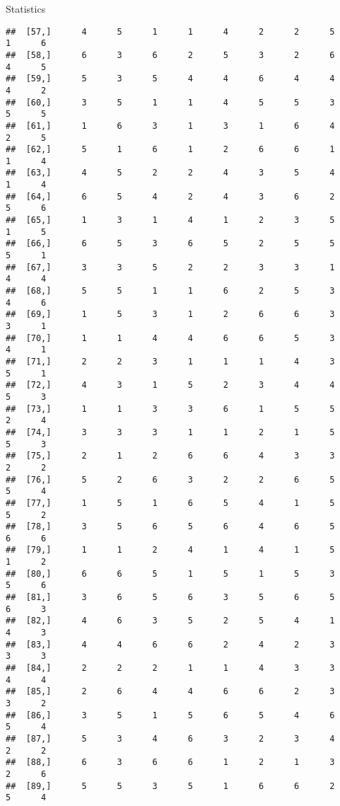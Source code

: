 \documentclass[
  ignorenonframetext,
]{beamer}
\begin{document}
\begin{frame}[fragile]{Statistics}
\begin{verbatim}
##  [57,]      4      5      1      1      4      2      2      5      1      6
##  [58,]      6      3      6      2      5      3      2      6      4      5
##  [59,]      5      3      5      4      4      6      4      4      4      2
##  [60,]      3      5      1      1      4      5      5      3      5      5
##  [61,]      1      6      3      1      3      1      6      4      2      5
##  [62,]      5      1      6      1      2      6      6      1      1      4
##  [63,]      4      5      2      2      4      3      5      4      1      4
##  [64,]      6      5      4      2      4      3      6      2      5      6
##  [65,]      1      3      1      4      1      2      3      5      1      5
##  [66,]      6      5      3      6      5      2      5      5      5      1
##  [67,]      3      3      5      2      2      3      3      1      4      4
##  [68,]      5      5      1      1      6      2      5      3      4      6
##  [69,]      1      5      3      1      2      6      6      3      3      1
##  [70,]      1      1      4      4      6      6      5      3      4      1
##  [71,]      2      2      3      1      1      1      4      3      5      1
##  [72,]      4      3      1      5      2      3      4      4      5      3
##  [73,]      1      1      3      3      6      1      5      5      2      4
##  [74,]      3      3      3      1      1      2      1      5      5      3
##  [75,]      2      1      2      6      6      4      3      3      2      2
##  [76,]      5      2      6      3      2      2      6      5      5      4
##  [77,]      1      5      1      6      5      4      1      5      5      2
##  [78,]      3      5      6      5      6      4      6      5      6      6
##  [79,]      1      1      2      4      1      4      1      5      1      2
##  [80,]      6      6      5      1      5      1      5      3      5      6
##  [81,]      3      6      5      6      3      5      6      5      6      3
##  [82,]      4      6      3      5      2      5      4      1      4      3
##  [83,]      4      4      6      6      2      4      2      3      3      3
##  [84,]      2      2      2      1      1      4      3      3      4      4
##  [85,]      2      6      4      4      6      6      2      3      3      2
##  [86,]      3      5      1      5      6      5      4      6      5      4
##  [87,]      5      3      4      6      3      2      3      4      2      2
##  [88,]      6      3      6      6      1      2      1      3      2      6
##  [89,]      5      5      3      5      1      6      6      2      5      4

\end{verbatim}
\end{frame}
\end{document}
